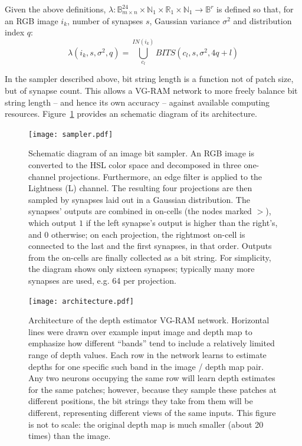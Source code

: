\documentclass[twocolumn, 9pt]{jsproceedings}
\begin{document}
Given the above definitions, \(\lambda : \mathbb{B}^{24}_{m \times n} \times \mathbb{N}_1 \times \mathbb{R}_1 \times \mathbb{N}_1 \to \mathbb{B}^r \) is defined so that, for an RGB image \(i_k\), number of synapses \(s\), Gaussian variance \(\sigma^2\) and distribution index \(q\):
\begin{equation}
\lambda(i_k, s, \sigma^2, q) = \bigcup_{c_l}^{IN(i_k)}{BITS(c_l, s, \sigma^2, 4 q + l)}
\end{equation}

In the sampler described above, bit string length is a function not of patch size, but of synapse count. This allows a VG-RAM network to more freely balance bit string length -- and hence its own accuracy -- against available computing resources. Figure~\ref{fig:sampler} provides an schematic diagram of its architecture.

\begin{figure}[h!]
\texttt{[image: sampler.pdf]}
\caption{Schematic diagram of an image bit sampler. An RGB image is converted to the HSL color space and decomposed in three one-channel projections. Furthermore, an edge filter is applied to the Lightness (L) channel. The resulting four projections are then sampled by synapses laid out in a Gaussian distribution. The synapses' outputs are combined in on-cells (the nodes marked \(>\)), which output \(1\) if the left synapse's output is higher than the right's, and \(0\) otherwise; on each projection, the rightmost on-cell is connected to the last and the first synapses, in that order. Outputs from the on-cells are finally collected as a bit string. For simplicity, the diagram shows only sixteen synapses; typically many more synapses are used, e.g. 64 per projection.}
\label{fig:sampler}
\end{figure}

\begin{figure}[h!]
\texttt{[image: architecture.pdf]}
\caption{Architecture of the depth estimator VG-RAM network. Horizontal lines were drawn over example input image and depth map to emphasize how different ``bands'' tend to include a relatively limited range of depth values. Each row in the network learns to estimate depths for one specific such band in the image / depth map pair. Any two neurons occupying the same row will learn depth estimates for the same patches; however, because they sample these patches at different positions, the bit strings they take from them will be different, representing different views of the same inputs. This figure is not to scale: the original depth map is much smaller (about 20 times) than the image.}
\label{fig:architecture}
\end{figure}
\end{document}

